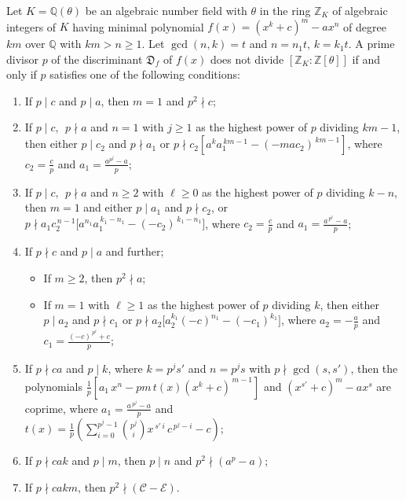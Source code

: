 \documentclass[10pt,a4paper]{amsart}
\newcommand{\D}{\mathfrak{D}}
\newcommand{\Z}{\mathbb{Z}}
\newcommand{\calC}{\mathcal{C}}
\newcommand{\calE}{\mathcal{E}}
\begin{document}
\begin{theorem} \label{monogeneity of f(x)}
	Let $K=\mathbb Q(\theta)$ be an algebraic number field with $\theta$ in the ring $\Z_K$ of algebraic integers of $K$ having  minimal polynomial   $f(x) = (x^k+c)^m-ax^n$ of degree $km$ over $\mathbb Q$ with   $km>n\geq{1}$. Let $\gcd(n,k) = t$ and $n = n_1t,\, k = k_1t.$ A prime divisor $p$ of the discriminant  $\D_f$ of $f(x)$ does not divide $[\Z_{K} : \Z[\theta]]$ if and only if $p$  satisfies one of the following conditions: 
	 \begin{enumerate}[label=\textup{(\roman{enumi})}]
    \item  If $p\mid c$  and $p\mid a$, then $m=1$ and $p^2\nmid c$;
    \item  If $p\mid c,~~p\nmid a$ and $n=1$  with $j\geq 1$ as the highest power of $p$ dividing $km-1$, then either $p\mid c_2$ and $p\nmid a_1$ or $p\nmid c_2[a^ka_1^{\,km-1}-(-mac_2)^{\,km-1}]$, where $c_2=\frac{c}{p}$ and $a_1=\frac{a^{p^j}-a}{p}$;
    \item  If $p\mid c,~~p\nmid a$ and $n\geq 2$ with $\ell\geq 0$ as the highest power of $p$ dividing $k-n$, then $m=1$ and  either
$p\mid a_{1}$ and $p\nmid c_{2}$, or $p\nmid a_{1}c_{2}^{\,n-1}
\bigl[a^{n_1}a_{1}^{\,k_1-n_1}-(-c_{2})^{\,k_1-n_1}\bigr]$, where $c_2=\frac{c}{p}$ and $a_1=\frac{a^{\,p^{\ell}}-a}{p}$;
    \item  If $p\nmid c$ and $p\mid a$ and further;
    \begin{itemize}
        \item[\textup{(a)}] If $m\geq 2$, then $p^2\nmid a$;
        \item [\textup{(b)}] If $m=1$ with $\ell\geq 1$ as the highest power of $p$ dividing $k$, then either $p\mid a_2$ and $p\nmid c_1$ or $p\nmid a_2\bigl[a_{2}^{k_{1}}(-c)^{n_{1}}-(-c_{1})^{k_{1}}\bigr]$, where $a_2=-\frac{a}{p}$ and $c_1=\frac{(-c)^{\,p^{\ell}}+c}{p}$;
    \end{itemize}
    \item If $p \nmid ca$ and $p \mid k$, where $k = p^{j}s'$ and $n = p^{j}s$ with 
$p \nmid \gcd(s,s')$, then the polynomials $\frac{1}{p}[a_1\,x^{n} - p m\, t(x)(x^{k} + c)^{\,m-1}]$ and $(x^{s'} + c)^m - a x^s$ are coprime, where $a_1=\frac{a^{\,p^{j}}-a}{p}$ and\\ $t(x) = \frac{1}{p} \left( \sum_{i=0}^{p^{j}-1} \binom{p^{j}}{i} x^{\,s' \,i} \,c^{\,p^{j}-i} - c \right)$;
     \item If $p\nmid cak$ and $p\mid m$, then $p \mid n$ and $p^2\nmid (a^{p}-a)$;
    \item  If $p\nmid cakm$, then $p^2\nmid (\calC-\calE).$
	\end{enumerate}
\end{theorem}    
\end{document}
